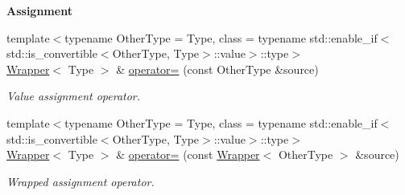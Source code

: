 \begin{Indent}{\bf Assignment}\par
\begin{DoxyCompactItemize}
\item 
{\footnotesize template$<$typename Other\-Type  = Type, class  = typename std\-::enable\-\_\-if$<$std\-::is\-\_\-convertible$<$\-Other\-Type, Type$>$\-::value$>$\-::type$>$ }\\\hyperlink{exceptionmagrathea_1_1Wrapper}{Wrapper}$<$ Type $>$ \& \hyperlink{exceptionmagrathea_1_1Wrapper_a43c237e1e1512edbcb2809c6d9fb737c}{operator=} (const Other\-Type \&source)
\begin{DoxyCompactList}\small\item\em Value assignment operator. \end{DoxyCompactList}\item 
{\footnotesize template$<$typename Other\-Type  = Type, class  = typename std\-::enable\-\_\-if$<$std\-::is\-\_\-convertible$<$\-Other\-Type, Type$>$\-::value$>$\-::type$>$ }\\\hyperlink{exceptionmagrathea_1_1Wrapper}{Wrapper}$<$ Type $>$ \& \hyperlink{exceptionmagrathea_1_1Wrapper_a6bc52b44274ded6ce790d2489e7b5f60}{operator=} (const \hyperlink{exceptionmagrathea_1_1Wrapper}{Wrapper}$<$ Other\-Type $>$ \&source)
\begin{DoxyCompactList}\small\item\em Wrapped assignment operator. \end{DoxyCompactList}\end{DoxyCompactItemize}
\end{Indent}
